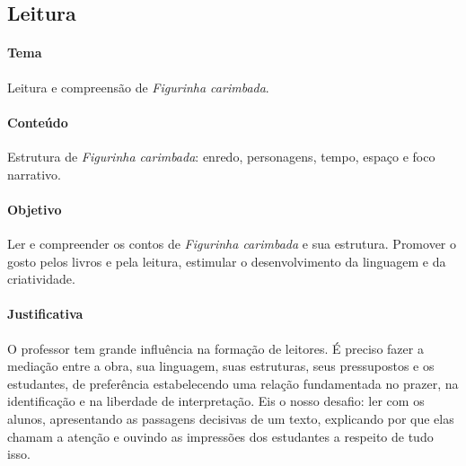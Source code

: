 \documentclass[11pt]{extarticle}
\begin{document}

\subsection{Leitura}


\paragraph{Tema} Leitura e compreensão de \textit{Figurinha carimbada}.

\paragraph{Conteúdo} Estrutura de \textit{Figurinha carimbada}: enredo, personagens, tempo, espaço e foco narrativo.  

\paragraph{Objetivo} Ler e compreender os contos de \textit{Figurinha carimbada} e sua estrutura. Promover o gosto pelos livros e pela leitura, estimular o desenvolvimento da linguagem e da criatividade.   

\paragraph{Justificativa} O professor tem grande influência na formação de leitores. É preciso fazer a mediação entre a obra, sua linguagem, suas estruturas, seus pressupostos e os estudantes, de preferência estabelecendo uma relação fundamentada no prazer, na identificação e na liberdade de interpretação. Eis o nosso desafio: ler com os alunos, apresentando as passagens decisivas de um texto, explicando por que elas chamam a atenção e  ouvindo as impressões dos estudantes a respeito de tudo isso. 
\end{document}
